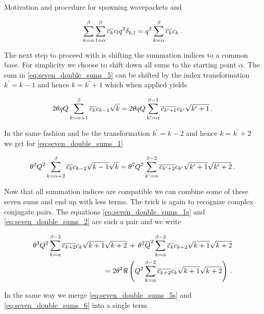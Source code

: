 \begin{chapter}{Motivation and procedure for spawning wavepackets}
and

\begin{equation} \label{eq:seven_double_sums_7}
  \sum_{k=\alpha}^\beta \sum_{l=\alpha}^\beta \overline{c_k} c_l q^2 \delta_{k,l}
  = q^2 \sum_{k=\alpha}^\beta \overline{c_k} c_k \,.
\end{equation}

The next step to proceed with is shifting the summation indices to a common base. For simplicity
we choose to shift down all sums to the starting point $\alpha$. The sum in \eqref{eq:seven_double_sums_5}
can be shifted by the index transformation $k^\prime = k-1$ and hence $k = k^\prime+1$
which when applied yields

\begin{equation} \label{eq:seven_double_sums_5s}
  2\theta qQ \sum_{k=\alpha+1}^\beta \overline{c_k} c_{k-1} \sqrt{k}
  = 2\theta qQ \sum_{k^\prime=\alpha}^{\beta-1} \overline{c_{k^\prime+1}} c_{k^\prime} \sqrt{k^\prime+1} \,.
\end{equation}

In the same fashion and be the transformation $k^\prime = k-2$ and hence $k = k^\prime+2$
we get for \eqref{eq:seven_double_sums_1}

\begin{equation} \label{eq:seven_double_sums_1s}
  \theta^2 Q^2 \sum_{k=\alpha+2}^\beta \overline{c_k} c_{k-2} \sqrt{k-1} \sqrt{k}
  = \theta^2 Q^2 \sum_{k^\prime=\alpha}^{\beta-2} \overline{c_{k^\prime+2}} c_{k^\prime} \sqrt{k^\prime+1} \sqrt{k^\prime+2} \,.
\end{equation}

Now that all summation indices are compatible we can combine some of these seven sums
and end up with less terms. The trick is again to recognize complex conjugate
pairs. The equations \eqref{eq:seven_double_sums_1s} and \eqref{eq:seven_double_sums_2}
are such a pair and we write

\begin{align} \label{eq:seven_double_sums_c12}
  \theta^2 Q^2 \sum_{k=\alpha}^{\beta-2} \overline{c_{k+2}} c_{k} \sqrt{k+1} \sqrt{k+2}
  \, + \, \theta^2 \overline{Q}^2 \sum_{k=\alpha}^{\beta-2} \overline{c_k} c_{k+2} \sqrt{k+1}\sqrt{k+2} \nonumber \\
  = 2 \theta^2 \Re \left( Q^2 \sum_{k=\alpha}^{\beta-2} \overline{c_{k+2}} c_{k} \sqrt{k+1} \sqrt{k+2} \right) \,.
\end{align}

In the same way we merge \eqref{eq:seven_double_sums_5s} and \eqref{eq:seven_double_sums_6}
into a single term


\end{chapter}
